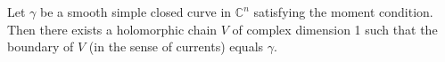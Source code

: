 
Let $\gamma$ be a smooth simple closed curve in $\mathbb{C}^n$ satisfying the moment condition. Then there exists a holomorphic chain $V$ of complex dimension 1 such that the boundary of $V$ (in the sense of currents) equals $\gamma$.
